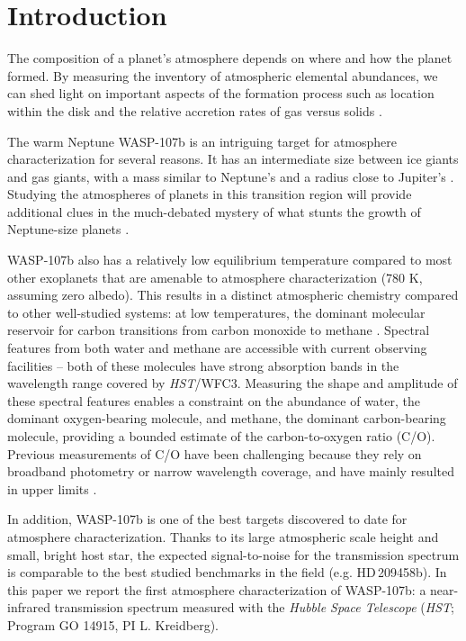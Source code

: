 \documentclass[twocolumn, trackchanges]{aastex61}
\begin{document}



\section{Introduction} \label{sec:intro}
The composition of a planet's atmosphere depends on where and how the planet formed. By measuring the inventory of atmospheric elemental abundances, we can shed light on important aspects of the formation process such as location within the disk and the relative accretion rates of gas versus solids \citep[][]{oberg11, fortney13, madhusudhan14,  mordasini16, espinoza17}.  

The warm Neptune WASP-107b is an intriguing target for atmosphere characterization for several reasons.  It has an intermediate size between ice giants and gas giants, with a mass similar to Neptune's and a radius close to Jupiter's \citep[$0.12\,M_\mathrm{Jup}$, $0.94\,R_\mathrm{Jup}$;][]{anderson17}. Studying the atmospheres of planets in this transition region will provide additional clues in the much-debated mystery of what stunts the growth of Neptune-size planets \citep[e.g][]{pollack96, dawson16, frelikh17}.  

WASP-107b also has a relatively low equilibrium temperature compared to most other exoplanets that are amenable to atmosphere characterization (780 K, assuming zero albedo).  This results in a distinct atmospheric chemistry compared to other well-studied systems: at low temperatures, the dominant molecular reservoir for carbon transitions from carbon monoxide to methane \citep{moses13}.  Spectral features from both water and methane are accessible with current observing facilities -- both of these molecules have strong absorption bands in the wavelength range covered by \emph{HST}/WFC3.  Measuring the shape and amplitude of these spectral features enables a constraint on the abundance of water, the dominant oxygen-bearing molecule, and methane, the dominant carbon-bearing molecule, providing a bounded estimate of the carbon-to-oxygen ratio (C/O). Previous measurements of C/O have been challenging because they rely on broadband photometry or narrow wavelength coverage, and have mainly resulted in upper limits \citep[e.g.][]{madhusudhan11, line14, benneke15, kreidberg15b}. 

In addition, WASP-107b is one of the best targets discovered to date for atmosphere characterization. Thanks to its large atmospheric scale height and small, bright host star, the expected signal-to-noise for the transmission spectrum is comparable to the best studied benchmarks in the field (e.g. HD\,209458b).  In this paper we report the first atmosphere characterization of WASP-107b: a near-infrared transmission spectrum measured with the \emph{Hubble Space Telescope} (\emph{HST}; Program GO 14915, PI L. Kreidberg).
\end{document}
